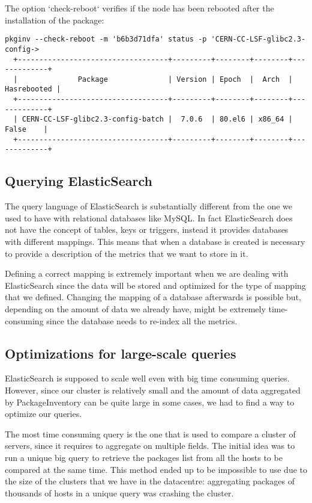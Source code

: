 \begin{itemize}
  The option `check-reboot` verifies if the node has been rebooted after the
  installation of the package:
 
  \begin{lstlisting}[frame=single]
  pkginv --check-reboot -m 'b6b3d71dfa' status -p 'CERN-CC-LSF-glibc2.3-config->
  +-----------------------------------+---------+--------+--------+-------------+
  |              Package              | Version | Epoch  |  Arch  | Hasrebooted |
  +-----------------------------------+---------+--------+--------+-------------+
  | CERN-CC-LSF-glibc2.3-config-batch |  7.0.6  | 80.el6 | x86_64 |    False    |
  +-----------------------------------+---------+--------+--------+-------------+
  \end{lstlisting} 

\end{itemize}

\subsection{Querying ElasticSearch}

The query language of ElasticSearch is substantially different from the
one we used to have with relational databases like MySQL\@. In fact
ElasticSearch does not have the concept of tables, keys or triggers,
instead it provides databases with different mappings. This means that
when a database is created is necessary to provide a description of the
metrics that we want to store in it.

Defining a correct mapping is extremely important when we are dealing with
ElasticSearch since the data will be stored and optimized for the type of
mapping that we defined. Changing the mapping of a database afterwards is
possible but, depending on the amount of data we already have, might be
extremely time-consuming since the database needs to re-index all the
metrics.

\subsection{Optimizations for large-scale queries}

ElasticSearch is supposed to scale well even with big time consuming
queries. However, since our cluster is relatively small and the amount of
data aggregated by PackageInventory can be quite large in some cases, we
had to find a way to optimize our queries.

The most time consuming query is the one that is used to compare a cluster
of servers, since it requires to aggregate on multiple fields. The initial
idea was to run a unique big query to retrieve the packages list from all
the hosts to be compared at the same time. This method ended up to be
impossible to use due to the size of the clusters that we have in the
datacentre: aggregating packages of thousands of hosts in a unique query
was crashing the cluster.

